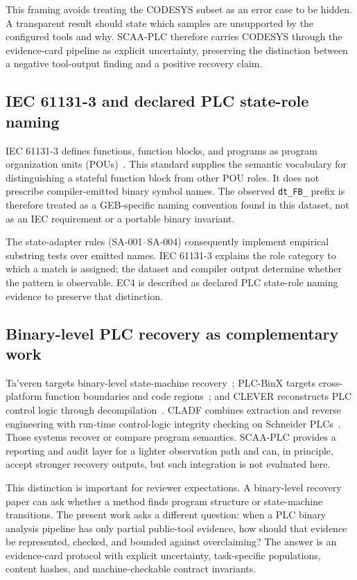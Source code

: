 \documentclass[manuscript,screen,review]{acmart}
\begin{document}
This framing avoids treating the CODESYS subset as an error case to be hidden. A transparent result should state which samples are unsupported by the configured tools and why. SCAA-PLC therefore carries CODESYS through the evidence-card pipeline as explicit uncertainty, preserving the distinction between a negative tool-output finding and a positive recovery claim.

\subsection{IEC 61131-3 and declared PLC state-role naming}

IEC 61131-3 defines functions, function blocks, and programs as program organization units (POUs)~\cite{iec61131_3}. This standard supplies the semantic vocabulary for distinguishing a stateful function block from other POU roles. It does not prescribe compiler-emitted binary symbol names. The observed \texttt{dt\_FB\_} prefix is therefore treated as a GEB-specific naming convention found in this dataset, not as an IEC requirement or a portable binary invariant.

The state-adapter rules (SA-001--SA-004) consequently implement empirical substring tests over emitted names. IEC 61131-3 explains the role category to which a match is assigned; the dataset and compiler output determine whether the pattern is observable. EC4 is described as declared PLC state-role naming evidence to preserve that distinction.

\subsection{Binary-level PLC recovery as complementary work}

Ta'veren targets binary-level state-machine recovery~\cite{taveren_ndss2026}; PLC-BinX targets cross-platform function boundaries and code regions~\cite{plcbinx_arxiv2026}; and CLEVER reconstructs PLC control logic through decompilation~\cite{clever_tifs2024}. CLADF combines extraction and reverse engineering with run-time control-logic integrity checking on Schneider PLCs~\cite{cladf_jiot2024}. Those systems recover or compare program semantics. SCAA-PLC provides a reporting and audit layer for a lighter observation path and can, in principle, accept stronger recovery outputs, but such integration is not evaluated here.

This distinction is important for reviewer expectations. A binary-level recovery paper can ask whether a method finds program structure or state-machine transitions. The present work asks a different question: when a PLC binary analysis pipeline has only partial public-tool evidence, how should that evidence be represented, checked, and bounded against overclaiming? The answer is an evidence-card protocol with explicit uncertainty, task-specific populations, content hashes, and machine-checkable contract invariants.
\end{document}
